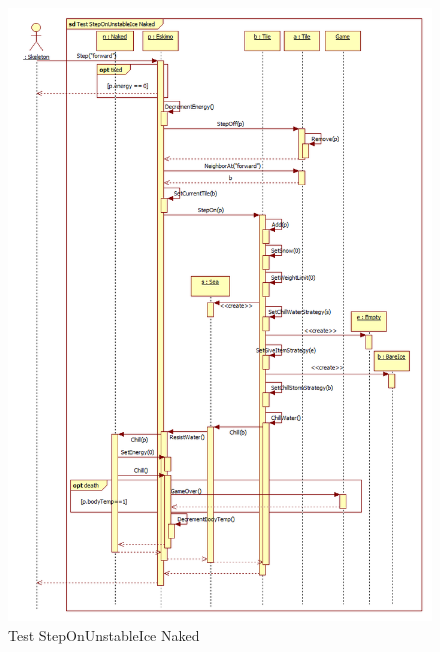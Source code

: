 \begin{figure}[H]
	\begin{center}
		\includegraphics[width=17cm]{chapters/chapter05/diagrams/Test_StepOnUnstableIce_Naked.png}
		\caption{Test StepOnUnstableIce Naked}
		\label{fig:Test StepOnUnstableIce Naked}
	\end{center}
\end{figure}

